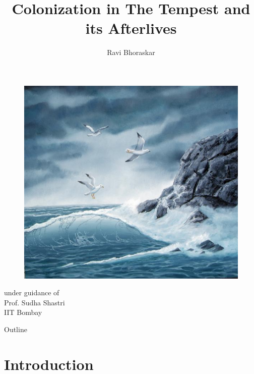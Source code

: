 \documentclass{beamer}
\title[The Tempest \hspace{15em} \insertframenumber / \inserttotalframenumber]{Colonization in The Tempest and its Afterlives}
\author {Ravi Bhoraskar}
\begin{document}
\begin{frame}[plain]
\titlepage
\begin{center}
\begin{figure}[htp]
  \begin{center}
    \centering
    \includegraphics[scale=0.17]{title.jpg}
  \end{center}
\end{figure}
under guidance of\\
Prof. Sudha Shastri\\
IIT Bombay
\end{center}
\end{frame}
\begin{frame}{Outline}
  \begin{multicols}{2}
  \tableofcontents  
  \end{multicols}
\end{frame}
\section{Introduction}
\end{document}
